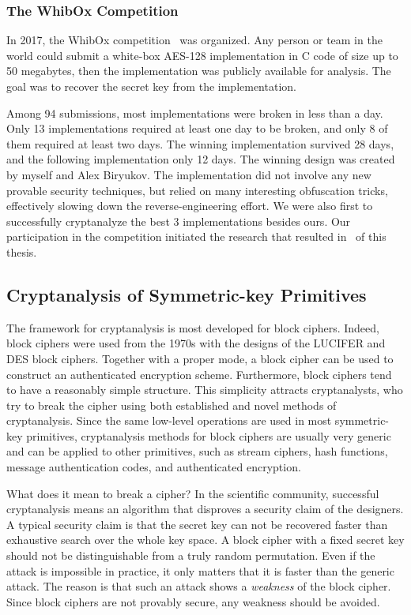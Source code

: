\subsubsection{The WhibOx Competition}

In 2017, the WhibOx competition~\cite{whibox} was organized. Any person or team in the world could submit a white-box AES-128 implementation in C code of size up to 50 megabytes, then the implementation was publicly available for analysis. The goal was to recover the secret key from the implementation.

Among 94 submissions, most implementations were broken in less than a day. Only 13 implementations required at least one day to be broken, and only 8 of them required at least two days. The winning implementation survived 28 days, and the following implementation only 12 days. The winning design was created by myself and Alex Biryukov. The implementation did not involve any new provable security techniques, but relied on many interesting obfuscation tricks, effectively slowing down the reverse-engineering effort. We were also first to successfully cryptanalyze the best 3 implementations besides ours. Our participation in the competition initiated the research that resulted in~ of this thesis.


\subsection{Cryptanalysis of Symmetric-key Primitives}

The framework for cryptanalysis is most developed for block ciphers. Indeed, block ciphers were used from the 1970s with the designs of the LUCIFER and DES block ciphers. Together with a proper mode, a block cipher can be used to construct an authenticated encryption scheme. Furthermore, block ciphers tend to have a reasonably simple structure. This simplicity attracts cryptanalysts, who try to break the cipher using both established and novel methods of cryptanalysis. Since the same low-level operations are used in most symmetric-key primitives, cryptanalysis methods for block ciphers are usually very generic and can be applied to other primitives, such as stream ciphers, hash functions, message authentication codes, and authenticated encryption. 

What does it mean to break a cipher? In the scientific community, successful cryptanalysis means an algorithm that disproves a security claim of the designers. A typical security claim is that the secret key can not be recovered faster than exhaustive search over the whole key space. A block cipher with a fixed secret key should not be distinguishable from a truly random permutation. Even if the attack is impossible in practice, it only matters that it is faster than the generic attack. The reason is that such an attack shows a \emph{weakness} of the block cipher. Since block ciphers are not provably secure, any weakness should be avoided.

